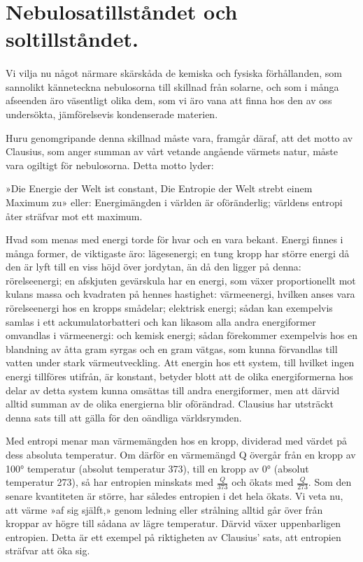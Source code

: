 \documentclass[a4paper, 12pt, oneside, swedish]{article}
\begin{document}
\section{Nebulosatillståndet och soltillståndet.}
\paragraph{}
Vi vilja nu något närmare skärskåda de kemiska och fysiska förhållanden, som sannolikt känneteckna nebulosorna till skillnad från solarne, och som i många afseenden äro väsentligt olika dem, som vi äro vana att finna hos den av oss undersökta, jämförelsevis kondenserade materien.

Huru genomgripande denna skillnad måste vara, framgår däraf, att det motto av Clausius, som anger summan av vårt vetande angående värmets natur, måste vara ogiltigt för nebulosorna. Detta motto lyder:

»Die Energie der Welt ist constant, Die Entropie der Welt strebt einem Maximum zu» eller: Energimängden i världen är oföränderlig; världens entropi åter sträfvar mot ett maximum.

Hvad som menas med energi torde för hvar och en vara bekant. Energi finnes i många former, de viktigaste äro: lägesenergi; en tung kropp har större energi då den är lyft till en viss höjd över jordytan, än då den ligger på denna: rörelseenergi; en afskjuten gevärskula har en energi, som växer proportionellt mot kulans massa och kvadraten på hennes hastighet: värmeenergi, hvilken anses vara rörelseenergi hos en kropps smådelar; elektrisk energi; sådan kan exempelvis samlas i ett ackumulatorbatteri och kan likasom alla andra energiformer omvandlas i värmeenergi: och kemisk energi; sådan förekommer exempelvis hos en blandning av åtta gram syrgas och en gram vätgas, som kunna förvandlas till vatten under stark värmeutveckling. Att energin hos ett system, till hvilket ingen energi tillföres utifrån, är konstant, betyder blott att de olika energiformerna hos delar av detta system kunna omsättas till andra energiformer, men att därvid alltid summan av de olika energierna blir oförändrad. Clausius har utsträckt denna sats till att gälla för den oändliga världsrymden.

Med entropi menar man värmemängden hos en kropp, dividerad med värdet på dess absoluta temperatur. Om därför en värmemängd Q övergår från en kropp av 100° temperatur (absolut temperatur 373), till en kropp av 0° (absolut temperatur 273), så har entropien minskats med $\frac{Q}{373}$ och ökats med $\frac{Q}{273}$. Som den senare kvantiteten är större, har således entropien i det hela ökats. Vi veta nu, att värme »af sig själft,» genom ledning eller strålning alltid går över från kroppar av högre till sådana av lägre temperatur. Därvid växer uppenbarligen entropien. Detta är ett exempel på riktigheten av Clausius' sats, att entropien sträfvar att öka sig.
\end{document}
